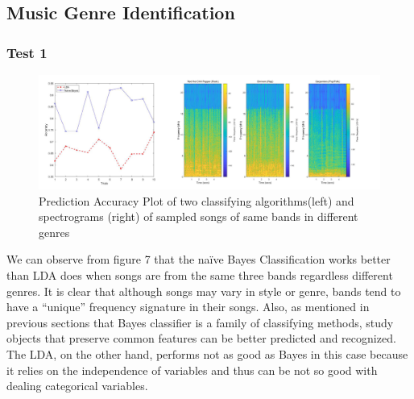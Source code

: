 \documentclass[11pt,a4paper]{article}
\numberwithin{equation}{subsection}
\begin{document}
\subsection{Music Genre Identification}
\subsubsection{Test 1}
\begin{figure}[H]
\begin{center}
\includegraphics[scale=0.20]{t1.jpg}
\caption{Prediction Accuracy Plot of two classifying algorithms(left) and spectrograms (right) of sampled songs of same bands in different genres}
\end{center}
\end{figure}
We can observe from figure 7 that the na\"ive Bayes Classification works better than LDA does when songs are from the same three bands regardless different genres. It is clear that although songs may vary in style or genre, bands tend to have a ``unique'' frequency signature in their songs. Also, as mentioned in previous sections that Bayes classifier is a family of classifying methods, study objects that preserve common features can be better predicted and recognized.\\
The LDA, on the other hand, performs not as good as Bayes in this case because it relies on the independence of variables and thus can be not so good with dealing categorical variables.
\end{document}
